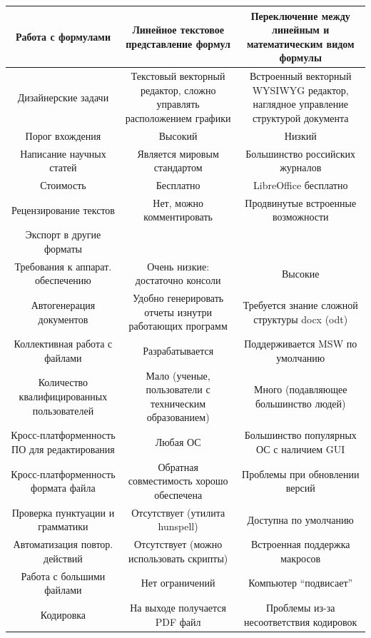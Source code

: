 \begin{xltabular}{\textwidth}{|>{\hsize}C|>{\hsize}C|>{\hsize}C|}
    Работа с формулами & Линейное текстовое представление формул & Переключение между линейным и математическим видом формулы \\
    \hline
    Дизайнерские задачи & Текстовый векторный редактор, сложно управлять расположением графики & Встроенный векторный WYSIWYG редактор, наглядное управление структурой документа \\
    \hline
    Порог вхождения & Высокий & Низкий \\
    \hline
    Написание научных статей & Является мировым стандартом & Большинство российских журналов \\
    \hline
    Стоимость & Бесплатно & LibreOffice бесплатно \\
    \hline
    Рецензирование текстов & Нет, можно комментировать & Продвинутые встроенные возможности \\
    \hline
    Экспорт в другие форматы &  \\
    \hline
    Требования к аппарат. обеспечению & Очень низкие: достаточно консоли & Высокие \\
    \hline
    Автогенерация документов & Удобно генерировать отчеты изнутри работающих программ & Требуется знание сложной структуры docx (odt) \\
    \hline
    Коллективная работа с файлами & Разрабатывается & Поддерживается MSW по умолчанию \\
    \hline
    Количество квалифицированных пользователей & Мало (ученые, пользователи с техническим образованием) & Много (подавляющее большинство людей) \\
    \hline
    Кросс-платформенность ПО для редактирования & Любая ОС & Большинство популярных ОС с наличием GUI \\
    \hline
    Кросс-платформенность формата файла & Обратная совместимость хорошо обеспечена & Проблемы при обновлении версий \\
    \hline
    Проверка пунктуации и грамматики & Отсутствует (утилита hunspell) & Доступна по умолчанию \\
    \hline
    Автоматизация повтор. действий & Отсутствует (можно использовать скрипты) & Встроенная поддержка макросов
    \\\hline
    Работа с большими файлами & Нет ограничений & Компьютер \enquote{подвисает}
    \\\hline
    Кодировка & На выходе получается PDF файл & Проблемы из-за несоответствия кодировок
    \\\hline
\end{xltabular}


